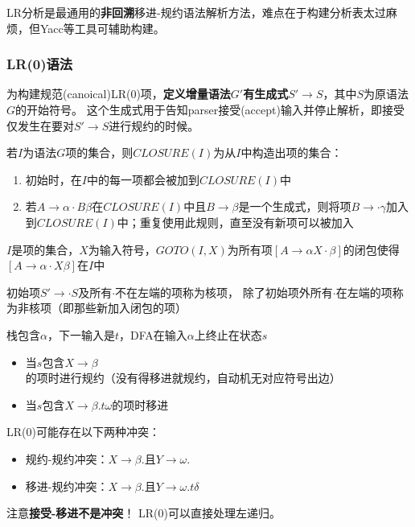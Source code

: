 LR分析是最通用的\textbf{非回溯}移进-规约语法解析方法，难点在于构建分析表太过麻烦，但Yacc等工具可辅助构建。

\subsubsection{LR(0)语法}
为构建规范(canoical)LR(0)项，\textbf{定义增量语法$G'$有生成式$S'\to S$}，其中$S$为原语法$G$的开始符号。
这个生成式用于告知parser接受(accept)输入并停止解析，即接受仅发生在要对$S'\to S$进行规约的时候。

\begin{definition}[CLOSURE]
若$I$为语法$G$项的集合，则$CLOSURE(I)$为从$I$中构造出项的集合：
\begin{enumerate}
	\item 初始时，在$I$中的每一项都会被加到$CLOSURE(I)$中
	\item 若$A\to\alpha\cdot B\beta$在$CLOSURE(I)$中且$B\to\beta$是一个生成式，则将项$B\to\cdot\gamma$加入到$CLOSURE(I)$中；重复使用此规则，直至没有新项可以被加入
\end{enumerate}
\end{definition}
\begin{definition}[GOTO]
$I$是项的集合，$X$为输入符号，$GOTO(I,X)$为所有项$[A\to\alpha X\cdot\beta]$的闭包使得$[A\to\alpha\cdot X\beta]$在$I$中
\end{definition}

\begin{definition}
初始项$S'\to\cdot S$及所有$\cdot$不在左端的项称为核项，
除了初始项外所有$\cdot$在左端的项称为非核项（即那些新加入闭包的项）
\end{definition}

\begin{definition}[LR(0)语法]
栈包含$\alpha$，下一输入是$t$，DFA在输入$\alpha$上终止在状态$s$
\begin{itemize}
	\item 当$s$包含$X\to\beta$的项时进行规约（没有得移进就规约，自动机无对应符号出边）
	\item 当$s$包含$X\to\beta.t\omega$的项时移进
\end{itemize}
\end{definition}

LR(0)可能存在以下两种冲突：
\begin{itemize}
	\item 规约-规约冲突：$X\to\beta.$且$Y\to\omega.$
	\item 移进-规约冲突：$X\to\beta.$且$Y\to\omega.t\delta$
\end{itemize}
注意\textbf{接受-移进不是冲突}！
LR(0)可以直接处理左递归。

